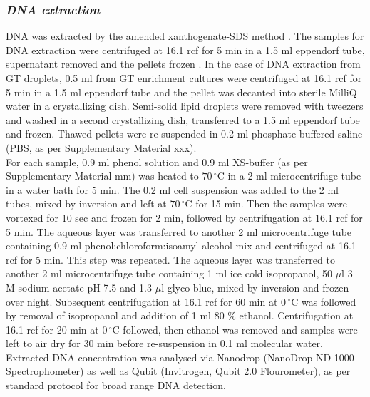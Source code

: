 \documentclass[twoside]{article}
\begin{document}
\subsubsection{\emph{DNA extraction}}
DNA was extracted by the amended xanthogenate-SDS method \cite{tillett2000xanthogenate}. The samples for DNA extraction were centrifuged at 16.1 rcf for 5 min in a 1.5 ml eppendorf tube, supernatant removed and the pellets frozen . In the case of DNA extraction from GT droplets, 0.5 ml from GT enrichment cultures were centrifuged at 16.1 rcf for 5 min in a 1.5 ml eppendorf tube and the pellet was decanted into sterile MilliQ water in a crystallizing dish. Semi-solid lipid droplets were removed with tweezers and washed in a second crystallizing dish, transferred to a 1.5 ml eppendorf tube and frozen. Thawed pellets were re-suspended in 0.2 ml phosphate buffered saline (PBS, as per Supplementary Material xxx).\\


For each sample, 0.9 ml phenol solution and 0.9 ml XS-buffer (as per Supplementary Material mm) was  heated to $70\,^{\circ}\mathrm{C}$ in a 2 ml microcentrifuge tube in a water bath for 5 min. The 0.2 ml cell suspension was added to the 2 ml tubes, mixed by inversion and left at $70\,^{\circ}\mathrm{C}$ for 15 min. Then the samples were vortexed for 10 sec and frozen for 2 min, followed by centrifugation at 16.1 rcf for 5 min. The aqueous layer was transferred to another 2 ml microcentrifuge tube containing 0.9 ml phenol:chloroform:isoamyl alcohol mix and centrifuged at 16.1 rcf for 5 min. This step was repeated. The aqueous layer was transferred to another 2 ml microcentrifuge tube containing 1 ml ice cold isopropanol, 50 $\mu$l 3 M sodium acetate pH 7.5 and 1.3 $\mu$l glyco blue, mixed by inversion and frozen over night. Subsequent centrifugation at 16.1 rcf for 60 min at $0\,^{\circ}\mathrm{C}$ was followed by removal of isopropanol and addition of 1 ml 80 \% ethanol. Centrifugation at 16.1 rcf for 20 min at $0\,^{\circ}\mathrm{C}$ followed, then ethanol was removed and samples were left to air dry for 30 min before re-suspension in 0.1 ml molecular water.
\\ 
Extracted DNA concentration was analysed via Nanodrop (NanoDrop ND-1000 Spectrophometer) as well as Qubit (Invitrogen, Qubit 2.0 Flourometer), as per standard protocol for broad range DNA detection.
\end{document}
